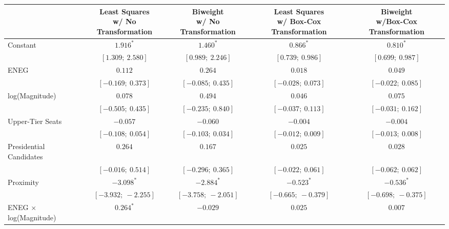
\begin{tabular}{l c c c c }
\hline
 & \specialcell{Least Squares\\w/ No Transformation} & \specialcell{Biweight\\w/ No Transformation} & \specialcell{Least Squares\\w/ Box-Cox Transformation} & \specialcell{Biweight\\w/Box-Cox Transformation} \\
\hline
Constant                                   & $1.916^{*}$         & $1.460^{*}$         & $0.866^{*}$         & $0.810^{*}$         \\
                                           & $[1.309;\ 2.580]$   & $[0.989;\ 2.246]$   & $[0.739;\ 0.986]$   & $[0.699;\ 0.987]$   \\
ENEG                                       & $0.112$             & $0.264$             & $0.018$             & $0.049$             \\
                                           & $[-0.169;\ 0.373]$  & $[-0.085;\ 0.435]$  & $[-0.028;\ 0.073]$  & $[-0.022;\ 0.085]$  \\
log(Magnitude)                             & $0.078$             & $0.494$             & $0.046$             & $0.075$             \\
                                           & $[-0.505;\ 0.435]$  & $[-0.235;\ 0.840]$  & $[-0.037;\ 0.113]$  & $[-0.031;\ 0.162]$  \\
Upper-Tier Seats                           & $-0.057$            & $-0.060$            & $-0.004$            & $-0.004$            \\
                                           & $[-0.108;\ 0.054]$  & $[-0.103;\ 0.034]$  & $[-0.012;\ 0.009]$  & $[-0.013;\ 0.008]$  \\
Presidential Candidates                    & $0.264$             & $0.167$             & $0.025$             & $0.028$             \\
                                           & $[-0.016;\ 0.514]$  & $[-0.296;\ 0.365]$  & $[-0.022;\ 0.061]$  & $[-0.062;\ 0.062]$  \\
Proximity                                  & $-3.098^{*}$        & $-2.884^{*}$        & $-0.523^{*}$        & $-0.536^{*}$        \\
                                           & $[-3.932;\ -2.255]$ & $[-3.758;\ -2.051]$ & $[-0.665;\ -0.379]$ & $[-0.698;\ -0.375]$ \\
ENEG $\times$ log(Magnitude)               & $0.264^{*}$         & $-0.029$            & $0.025$             & $0.007$             \\

\end{tabular}
